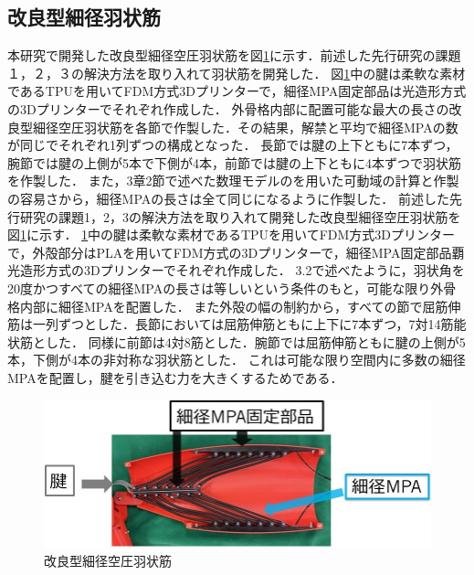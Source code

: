 \subsection{改良型細径羽状筋}
本研究で開発した改良型細径空圧羽状筋を図\ref{fig:ujyoukin_new}に示す．前述した先行研究の課題１，２，３の解決方法を取り入れて羽状筋を開発した．
図\ref{fig:ujyoukin_new}中の腱は柔軟な素材であるTPUを用いてFDM方式3Dプリンターで，細径MPA固定部品は光造形方式の3Dプリンターでそれぞれ作成した．
外骨格内部に配置可能な最大の長さの改良型細径空圧羽状筋を各節で作製した．その結果，解禁と平均で細径MPAの数が同じでそれぞれ1列ずつの構成となった．
長節では腱の上下ともに7本ずつ，腕節では腱の上側が5本で下側が4本，前節では腱の上下ともに4本ずつで羽状筋を作製した．
また，3章2節で述べた数理モデルのを用いた可動域の計算と作製の容易さから，細径MPAの長さは全て同じになるように作製した．
前述した先行研究の課題1，2，3の解決方法を取り入れて開発した改良型細径空圧羽状筋を図\ref{fig:ujyoukin_new}に示す．
\ref{fig:ujyoukin_new}中の腱は柔軟な素材であるTPUを用いてFDM方式3Dプリンターで，外殻部分はPLAを用いてFDM方式の3Dプリンターで，細径MPA固定部品覇光造形方式の3Dプリンターでそれぞれ作成した．
3.2で述べたように，羽状角を 20度かつすべての細径MPAの長さは等しいという条件のもと，可能な限り外骨格内部に細径MPAを配置した．
また外殻の幅の制約から，すべての節で屈筋伸筋は一列ずつとした．長節においては屈筋伸筋ともに上下に7本ずつ，7対14筋能状筋とした．
同様に前節は4対8筋とした．腕節では屈筋伸筋ともに腱の上側が5本，下側が4本の非対称な羽状筋とした．
これは可能な限り空間内に多数の細径MPAを配置し，腱を引き込む力を大きくするためである．
%
\begin{figure}[ht]
  \centering
  \includegraphics[scale=0.5]{image/uyjoukin_new.jpg}
  \caption{改良型細径空圧羽状筋}
  \label{fig:ujyoukin_new}
\end{figure}
%
